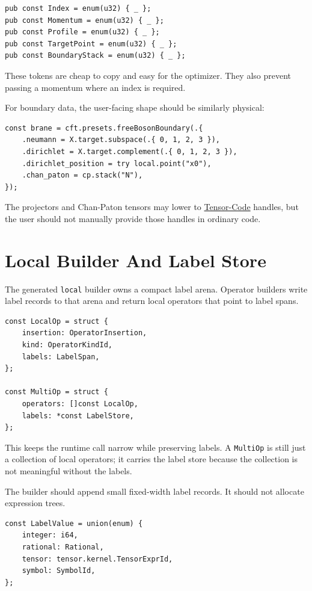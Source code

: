 \documentclass[11pt]{article}
\begin{document}
\begin{verbatim}
pub const Index = enum(u32) { _ };
pub const Momentum = enum(u32) { _ };
pub const Profile = enum(u32) { _ };
pub const TargetPoint = enum(u32) { _ };
pub const BoundaryStack = enum(u32) { _ };
\end{verbatim}

These tokens are cheap to copy and easy for the optimizer.  They also prevent
passing a momentum where an index is required.

For boundary data, the user-facing shape should be similarly physical:

\begin{verbatim}
const brane = cft.presets.freeBosonBoundary(.{
    .neumann = X.target.subspace(.{ 0, 1, 2, 3 }),
    .dirichlet = X.target.complement(.{ 0, 1, 2, 3 }),
    .dirichlet_position = try local.point("x0"),
    .chan_paton = cp.stack("N"),
});
\end{verbatim}

The projectors and Chan-Paton tensors may lower to \href{../org/tensor-code/tensor-code.org}{Tensor-Code} handles, but
the user should not manually provide those handles in ordinary code.
\section{Local Builder And Label Store}
\label{sec:orga9187b6}

The generated \texttt{local} builder owns a compact label arena.  Operator builders
write label records to that arena and return local operators that point to
label spans.

\begin{verbatim}
const LocalOp = struct {
    insertion: OperatorInsertion,
    kind: OperatorKindId,
    labels: LabelSpan,
};

const MultiOp = struct {
    operators: []const LocalOp,
    labels: *const LabelStore,
};
\end{verbatim}

This keeps the runtime call narrow while preserving labels.  A \texttt{MultiOp} is
still just a collection of local operators; it carries the label store because
the collection is not meaningful without the labels.

The builder should append small fixed-width label records.  It should not
allocate expression trees.

\begin{verbatim}
const LabelValue = union(enum) {
    integer: i64,
    rational: Rational,
    tensor: tensor.kernel.TensorExprId,
    symbol: SymbolId,
};
\end{verbatim}
\end{document}
